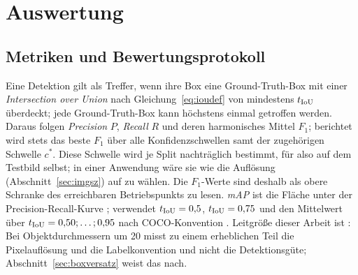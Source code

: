 %
%

\chapter{Auswertung}
\label{kap:auswertung}

\section{Metriken und Bewertungsprotokoll}
\label{sec:metriken}

Eine Detektion gilt als Treffer, wenn ihre Box eine Ground-Truth-Box mit einer
\emph{Intersection over Union} nach Gleichung~\eqref{eq:ioudef} von mindestens
$t_{\mathrm{IoU}}$ überdeckt; jede Ground-Truth-Box kann höchstens einmal getroffen
werden. Daraus folgen
\emph{Precision} $P$, \emph{Recall} $R$ und deren harmonisches Mittel $F_1$;
berichtet wird stets das beste $F_1$ über alle Konfidenzschwellen samt der
zugehörigen Schwelle $c^*$. Diese Schwelle wird je Split nachträglich bestimmt,
für  also auf dem Testbild selbst; in einer Anwendung wäre sie wie
die Auflösung (Abschnitt~\ref{sec:imgsz}) auf  zu wählen. Die
$F_1$-Werte sind deshalb als obere Schranke des erreichbaren Betriebspunkts zu
lesen. \emph{mAP} ist die Fläche unter der Precision-Recall-Kurve
\parencite{everingham2010}; \mAPfifty{} verwendet $t_{\mathrm{IoU}} = 0{,}5$,
\mAPseven{} $t_{\mathrm{IoU}} = 0{,}75$ und \mAPall{} den Mittelwert über
$t_{\mathrm{IoU}} = 0{,}50; \dots; 0{,}95$ nach
COCO-Konvention \parencite{lin2014coco}. Leitgröße dieser Arbeit ist
\mAPfifty{}: Bei Objektdurchmessern um 20\px{} misst \mAPall{} zu einem
erheblichen Teil die Pixelauflösung und die Labelkonvention und nicht die
Detektionsgüte; Abschnitt~\ref{sec:boxversatz} weist das nach.

